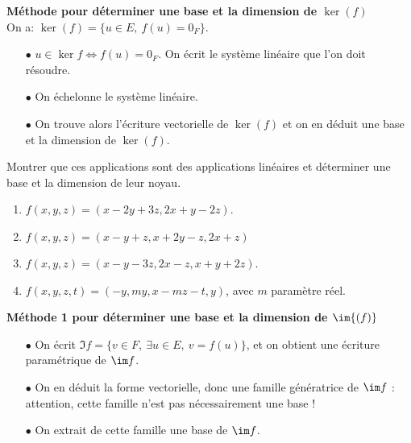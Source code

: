\documentclass[a4paper, 11pt]{article}
\begin{document}
\vspace{10cm}




\begin{dboxminipage}{0.8\textwidth}
\textbf{M\'ethode pour d\'eterminer une base et la dimension de $\ker{(f)}$}\\
On a: $\ker{(f)}=\lbrace u\in E,\ f(u)=0_F\rbrace$.
\begin{itemize}
\item[$\bullet$] $u\in\ker f\Longleftrightarrow f(u)=0_F$. On \'ecrit le syst\`eme lin\'eaire que l'on doit r\'esoudre.
\item[$\bullet$] On \'echelonne le syst\`eme lin\'eaire.
\item[$\bullet$] On trouve alors l'\'ecriture vectorielle de $\ker{(f)}$ et on en d\'eduit une base et la dimension de $\ker{(f)}$.
\end{itemize}

\end{dboxminipage}


{\footnotesize \begin{exercice} Montrer que ces applications sont des applications lin\'eaires et d\'eterminer une base et la dimension de leur noyau.
\begin{enumerate}
\item $f(x,y,z)=(x-2y+3z, 2x+y-2z)$.
\item $f(x,y,z)=( x-y+z,x+2y-z,2x+z )$
\item $f(x,y,z)=(x-y-3z,2x-z, x+y+2z)$.
\item $f(x,y,z,t)= (-y,my,x-mz-t,y)$, avec $m$ param\`etre r\'eel.
\end{enumerate}
\end{exercice}
}
\vsec

\begin{dboxminipage}{0.9\textwidth}
\textbf{M\'ethode 1 pour d\'eterminer une base et la dimension de $\im{(f)}$}
\begin{itemize}
\item[$\bullet$] On \'ecrit $\Im f=\lbrace v\in F,\ \exists u\in E,\ v=f(u)\rbrace$, et on obtient une \'ecriture param\'etrique de $\im f$.
\item[$\bullet$] On en d\'eduit la forme vectorielle, donc une famille g\'en\'eratrice de $\im f$ : attention, cette famille n'est pas n\'ecessairement une base !
\item[$\bullet$] On extrait de cette famille une base de $\im f$.
\end{itemize}
\end{dboxminipage}
\end{document}

